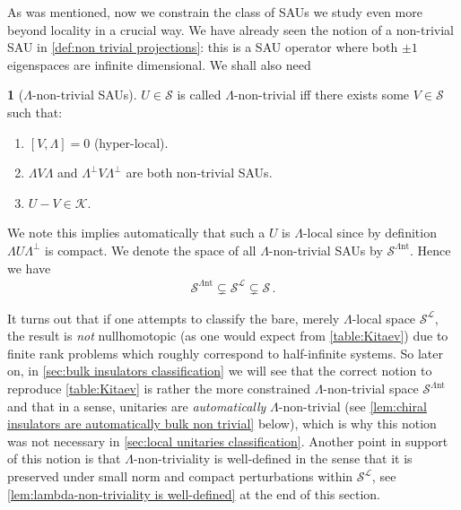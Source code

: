 \documentclass[a4paper,10pt]{article}
\numberwithin{equation}{section}
\theoremstyle{plain}
\theoremstyle{plain}
\theoremstyle{plain}
\theoremstyle{plain}
\theoremstyle{plain}
\theoremstyle{remark}
\theoremstyle{definition}
\newtheorem{defn}[thm]{\protect\definitionname}
\theoremstyle{plain}
\providecommand{\definitionname}{Definition}
\newcommand{\calSU}{\mathcal{S}}
\newcommand{\calK}{\mathcal{K}}
\newcommand{\calL}{\mathcal{L}}
\newcommand{\LamNT}{\Lambda\mathrm{nt}}
\newcommand{\LamNTSAU}{\calSU^{\LamNT}}
\newcommand{\eq}[1]{\begin{align*}#1\end{align*}}
\begin{document}
	As was mentioned, now we constrain the class of SAUs we study even more beyond locality in a crucial way. We have already seen the notion of a non-trivial SAU in \cref{def:non trivial projections}: this is a SAU operator where both $\pm1$ eigenspaces are infinite dimensional. We shall also need
	\begin{defn}[$\Lambda$-non-trivial SAUs]\label{def:Lambda-non-trivial SAUs} $U\in\calSU$ is called $\Lambda$-non-trivial iff there exists some $V\in\calSU$ such that:
		\begin{enumerate}
			\item $[V,\Lambda]=0$ (hyper-local).
			\item $\Lambda V\Lambda$ and $\Lambda^\perp V \Lambda^\perp$ are both non-trivial SAUs.
			\item $U-V\in\calK$.
		\end{enumerate}
		We note this implies automatically that such a $U$ is $\Lambda$-local since by definition $\Lambda U \Lambda^\perp$ is compact. We denote the space of all $\Lambda$-non-trivial SAUs by $\LamNTSAU$. Hence we have \eq{\LamNTSAU\subsetneq\calSU^\calL\subsetneq\calSU\,.}
	\end{defn}
	
	It turns out that if one attempts to classify the bare, merely $\Lambda$-local space $\calSU^\calL$, the result is \emph{not} nullhomotopic (as one would expect from \cref{table:Kitaev}) due to finite rank problems which roughly correspond to half-infinite systems. So later on, in \cref{sec:bulk insulators classification} we will see that the correct notion to reproduce \cref{table:Kitaev} is rather the more constrained $\Lambda$-non-trivial space $\LamNTSAU$ and that in a sense, unitaries are \emph{automatically} $\Lambda$-non-trivial (see \cref{lem:chiral insulators are automatically bulk non trivial} below), which is why this notion was not necessary in \cref{sec:local unitaries classification}. Another point in support of this notion is that $\Lambda$-non-triviality is well-defined in the sense that it is preserved under small norm and compact perturbations within $\calSU^\calL$, see \cref{lem:lambda-non-triviality is well-defined} at the end of this section.
	
	
	
\end{document}
